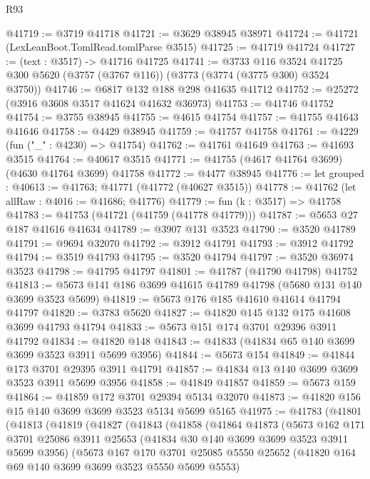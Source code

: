 \begin{lexlean}{R93}
\begin{coremodule}
@41719 := @3719 @41718
@41721 := @3629 @38945 @38971
@41724 := @41721 (LexLeanBoot.TomlRead.tomlParse @3515)
@41725 := @41719 @41724
@41727 := (text : @3517) -> @41716 @41725
@41741 := @3733
    @116
    @3524
    @41725
    @300
    @5620
    (@3757 (@3767 @116))
    (@3773 (@3774 (@3775 @300) @3524 @3750))
@41746 := @6817 @132 @188 @298 @41635 @41712
@41752 := @25272 (@3916 @3608 @3517 @41624 @41632 @36973)
@41753 := @41746 @41752
@41754 := @3755 @38945
@41755 := @4615 @41754
@41757 := @41755 @41643 @41646
@41758 := @4429 @38945
@41759 := @41757 @41758
@41761 := @4229 (fun ("_" : @4230) => @41754)
@41762 := @41761 @41649
@41763 := @41693 @3515
@41764 := @40617 @3515
@41771 := @41755 (@4617 @41764 @3699) (@4630 @41764 @3699) @41758
@41772 := @4477 @38945
@41776 := let grouped : @40613 := @41763; @41771 (@41772 (@40627 @3515))
@41778 := @41762 (let allRaw : @4016 := @41686; @41776)
@41779 := fun (k : @3517) => @41758
@41783 := @41753 (@41721 (@41759 (@41778 @41779)))
@41787 := @5653 @27 @187 @41616 @41634
@41789 := @3907 @131 @3523
@41790 := @3520 @41789
@41791 := @9694 @32070
@41792 := @3912 @41791
@41793 := @3912 @41792
@41794 := @3519 @41793
@41795 := @3520 @41794
@41797 := @3520 @36974 @3523
@41798 := @41795 @41797
@41801 := @41787 (@41790 @41798) @41752
@41813 := @5673 @141 @186 @3699 @41615 @41789 @41798 (@5680 @131 @140 @3699 @3523 @5699)
@41819 := @5673 @176 @185 @41610 @41614 @41794 @41797
@41820 := @3783 @5620
@41827 := @41820 @145 @132 @175 @41608 @3699 @41793 @41794
@41833 := @5673 @151 @174 @3701 @29396 @3911 @41792
@41834 := @41820 @148
@41843 := @41833 (@41834 @65 @140 @3699 @3699 @3523 @3911 @5699 @3956)
@41844 := @5673 @154
@41849 := @41844 @173 @3701 @29395 @3911 @41791
@41857 := @41834 @13 @140 @3699 @3699 @3523 @3911 @5699 @3956
@41858 := @41849 @41857
@41859 := @5673 @159
@41864 := @41859 @172 @3701 @29394 @5134 @32070
@41873 := @41820 @156 @15 @140 @3699 @3699 @3523 @5134 @5699 @5165
@41975 := @41783
    (@41801
      (@41813
        (@41819
          (@41827
            (@41843
              (@41858
                (@41864
                  @41873
                  (@5673
                    @162
                    @171
                    @3701
                    @25086
                    @3911
                    @25653
                    (@41834 @30 @140 @3699 @3699 @3523 @3911 @5699 @3956)
                    (@5673
                      @167
                      @170
                      @3701
                      @25085
                      @5550
                      @25652
                      (@41820 @164 @69 @140 @3699 @3699 @3523 @5550 @5699 @5553)

\end{coremodule}
\end{lexlean}

